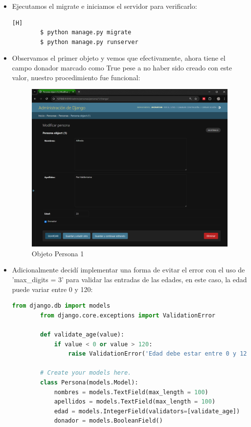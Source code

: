 \documentclass{article}
\begin{document}
\begin{itemize}
            \item Ejecutamos el migrate e iniciamos el servidor para verificarlo:

        \begin{lstlisting}[language=bash,caption={Makemigrations y migrate}][H]
        $ python manage.py migrate
        $ python manage.py runserver
        \end{lstlisting}

            \item Observamos el primer objeto y vemos que efectivamente, ahora tiene el campo donador marcado como True pese a no haber sido creado con este valor, nuestro procedimiento fue funcional:

        \begin{figure}[H]
            \centering
            \includegraphics[width=0.7\linewidth]{img/Persona1.png}
            \caption{Objeto Persona 1}
            \label{fig:enter-label}
        \end{figure}

            \item Adicionalmente decidí implementar una forma de evitar el error con el uso de 'max\_digits = 3' para validar las entradas de las edades, en este caso, la edad puede variar entre 0 y 120:

        \begin{lstlisting}[language=Python, caption={Validación de edad}]
        from django.db import models
        from django.core.exceptions import ValidationError
        
        def validate_age(value):
            if value < 0 or value > 120:
                raise ValidationError('Edad debe estar entre 0 y 120.')
            
        # Create your models here.
        class Persona(models.Model):
            nombres = models.TextField(max_length = 100)
            apellidos = models.TextField(max_length = 100)
            edad = models.IntegerField(validators=[validate_age])
            donador = models.BooleanField()
        \end{lstlisting}
        \end{itemize}
\end{document}
